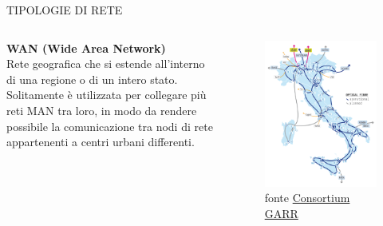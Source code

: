 \documentclass[aspectratio=1610]{beamer}
\begin{document}
\begin{frame}{TIPOLOGIE DI RETE}
    \begin{columns}
            \justifying
            \textbf{WAN (Wide Area Network)} \\
            Rete geografica che si estende all'interno di una regione o di un intero stato. Solitamente è utilizzata 
            per collegare più reti MAN tra loro, in modo da rendere possibile la comunicazione tra nodi di rete 
            appartenenti a centri urbani differenti.
            \begin{figure}
                \includegraphics[width=0.77\linewidth]{img/wan.png}
                \caption{{fonte \href{https://www.garr.it/it/infrastrutture/rete-nazionale/mappa-della-rete}{Consortium GARR}}}
            \end{figure}
    \end{columns}
\end{frame}
\end{document}
